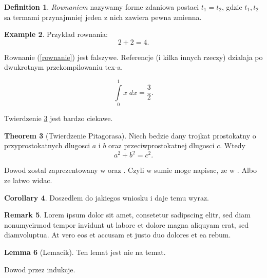 \documentclass[a4paper,11pt,twoside]{report}
\makeatletter
\theoremstyle{definition}
\newtheorem{theorem}{Theorem}[chapter]
\newtheorem{lemma}[theorem]{Lemma}
\newtheorem{example}[theorem]{Example}
\newtheorem{corollary}[theorem]{Corollary}
\newtheorem{definition}[theorem]{Definition}
\newtheorem{remark}[theorem]{Remark}
\renewenvironment{proof}[1][\proofname]
{\par
  \vspace{-12pt}%
  \pushQED{\qed}%
  \normalfont
  \topsep0pt \partopsep0pt %
  \trivlist
  \item[\hskip\labelsep
        \sc
    #1\@addpunct{:}]\ignorespaces
}
{%
  \popQED\endtrivlist\@endpefalse
  \addvspace{20pt} %
}
\makeatother
\begin{document}
\begin{definition}
\textit{Rownaniem} nazywamy forme zdaniowa postaci $t_1 = t_2$, gdzie $t_1, t_2$ sa termami przynajmniej jeden z nich zawiera pewna zmienna.
\end{definition}

\begin{example}
Przyklad rownania:
\begin{equation}
2+2=4.
\end{equation}


Rownanie (\ref{rownanie}) jest falszywe. Referencje (i kilka innych rzeczy) dzialaja po dwukrotnym przekompilowaniu tex-a.

\begin{equation}\label{rownanie}
\int \limits_{0}^{1} x \; dx = \frac{3}{2}.
\end{equation}

\end{example}

Twierdzenie \ref{Pitagoras} jest bardzo ciekawe.

\begin{theorem}[Twierdzenie Pitagorasa]\label{Pitagoras}
Niech bedzie dany trojkat prostokatny o przyprostokatnych dlugosci $a$ i $b$ oraz przeciwprostokatnej dlugosci $c$. Wtedy
$$
a^2 + b^2 = c^2.
$$
\end{theorem}

\begin{proof}
Dowod zostal zaprezentowany w \cite{Ktos} oraz \cite{Innyktos}. Czyli w sumie moge napisac, ze w \cite{Ktos, Innyktos}. Albo ze latwo widac.
\end{proof}

\begin{corollary}
Doszedlem do jakiegos wniosku i daje temu wyraz.
\end{corollary}




\begin{remark}
Lorem ipsum dolor sit amet, consetetur sadipscing elitr, sed diam nonumyeirmod tempor invidunt ut labore et dolore magna aliquyam erat, sed diamvoluptua. At vero eos et accusam et justo duo dolores et ea rebum.
\end{remark}

\begin{lemma}[Lemacik]
Ten lemat jest nie na temat.
\end{lemma}
\begin{proof} Dowod przez indukcje.
\end{proof}
\end{document}
